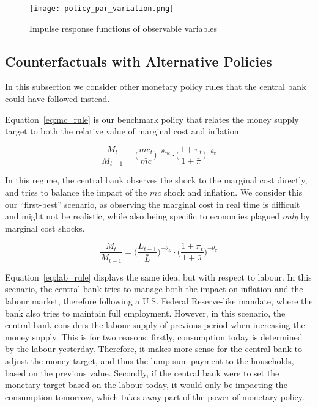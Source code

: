 \documentclass[12pt]{article}
\begin{document}
\begin{figure}[!h]
    \caption{Impulse response functions of observable variables}\label{fig:policy_par_variation}
    \centering
    \texttt{[image: policy\_par\_variation.png]}
\end{figure}


\subsection*{Counterfactuals with Alternative Policies}

In this subsection we consider other monetary policy rules that the central bank could have followed instead. 

Equation~\ref{eq:mc_rule} is our benchmark policy that relates the money supply target to both the relative value of marginal cost and inflation.

\begin{equation}\label{eq:mc_rule}
    \frac{M_t}{M_{t-1}}
          = \Big(\frac{mc_t}{\bar{mc}}\Big)^{-\theta_{mc}}
            \cdot \Big(\frac{1 + \pi_t}{1 + \bar{\pi}}\Big)^{-\theta_{\pi}}
\end{equation}

In this regime, the central bank observes the shock to the marginal cost directly, and tries to balance the impact of the $mc$ shock and inflation. We consider this our ``first-best'' scenario, as observing the marginal cost in real time is difficult and might not be realistic, while also being specific to economies plagued \textit{only} by marginal cost shocks.

\begin{equation}\label{eq:lab_rule}
    \frac{M_t}{M_{t-1}}
        = \Big(\frac{L_{t-1}}{\bar{L}}\Big)^{-\theta_L}
          \cdot \Big(\frac{1 + \pi_t}{1 + \bar{\pi}}\Big)^{-\theta_{\pi}}
\end{equation}

Equation~\ref{eq:lab_rule} displays the same idea, but with respect to labour. In this scenario, the central bank tries to manage both the impact on inflation and the labour market, therefore following a U.S. Federal Reserve-like mandate, where the bank also tries to maintain full employment. However, in this scenario, the central bank considers the labour supply of previous period when increasing the money supply. This is for two reasons: firstly, consumption today is determined by the labour yesterday. Therefore, it makes more sense for the central bank to adjust the money target, and thus the lump sum payment to the households, based on the previous value. Secondly, if the central bank were to set the monetary target based on the labour today, it would only be impacting the consumption tomorrow, which takes away part of the power of monetary policy.  
\end{document}
